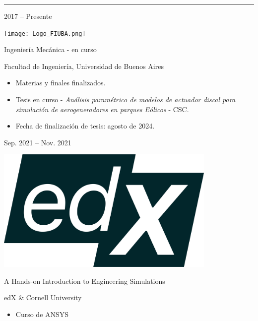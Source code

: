 \documentclass[a4paper,10pt]{article}
\newlength{\cvcolumngapwidth}
\newlength{\cvleftcolumnwidth}
\newlength{\cvrightcolumnwidth}
\newcommand{\cvsectionstyle}[1]{{\normalsize\cvsectionfont\textcolor{cvsectioncolor}{#1}}}
\newcommand{\cvtitlestyle}[1]{{\large\cvtitlefont\textcolor{cvtitlecolor}{#1}}}
\newcommand{\cvdurationstyle}[1]{{\small\cvdurationfont\textcolor{cvdurationcolor}{#1}}}
\newlength{\cvafteritemskipamount}
\newlength{\cvaftersectionskipamount}
\newlength{\cvaftertitleskipamount}
\newlength{\cvparskip}
\newcommand{\cvsection}[1]{
    \begin{minipage}[t]{\cvleftcolumnwidth}
        \raggedleft\cvsectionstyle{#1}
    \end{minipage}%
    \hspace{\cvcolumngapwidth}%
    \begin{minipage}[t]{\cvrightcolumnwidth}
        \textcolor{cvrulecolor}{\rule{\cvrightcolumnwidth}{0.3mm}}
    \end{minipage}

    \vspace{\cvaftersectionskipamount}
}
\newcommand{\cvitem}[2]{
    \begin{minipage}[t]{\cvleftcolumnwidth}
        \raggedleft #1
    \end{minipage}%
    \hspace{\cvcolumngapwidth}%
    \begin{minipage}[t]{\cvrightcolumnwidth}
        \setlength{\parskip}{\cvparskip} #2
    \end{minipage}

    \vspace{\cvafteritemskipamount}
}
\newcommand{\cvtitle}[1]{
    \cvtitlestyle{#1}

    \vspace{\cvaftertitleskipamount}
    \vspace{-\cvparskip}
}
\begin{document}

\cvsection{EDUCACIÓN}

\cvitem{
    \cvdurationstyle{2017 -- Presente}
}{
    \begin{minipage}{0.1\textwidth}
        \centering
        \texttt{[image: Logo\_FIUBA.png]}   
    \end{minipage}      
    \cvtitle{Ingeniería Mecánica - en curso}

    Facultad de Ingeniería, Universidad de Buenos Aires
    
    \begin{itemize}[leftmargin=*]
        \item Materias y finales finalizados.
        \item Tesis en curso - \textit{Análisis paramétrico de modelos de actuador discal para simulación de aerogeneradores en parques Eólicos} - CSC.
        \item Fecha de finalización de tesis: agosto de 2024.
    \end{itemize}
}

\cvitem{
    \cvdurationstyle{Sep. 2021 -- Nov. 2021}
}{
    \begin{minipage}{0.1\textwidth}
        \centering
        \includegraphics[width=0.8\textwidth]{Logo_edx.png}   
    \end{minipage}      
    \cvtitle{A Hands-on Introduction to Engineering Simulations}
    edX \& Cornell University

    \begin{itemize}
        \item Curso de ANSYS
    \end{itemize}
}
\end{document}
